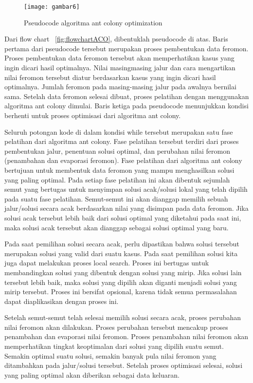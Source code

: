 \begin{itemize}
\begin{figure}[H]
	\centering
	\texttt{[image: gambar6]}
	\caption[Pseudocode ACO] {Pseudocode algoritma ant colony optimization}
	\label{fig:pseudocodeACO}
\end{figure}

Dari flow chart ~\ref{fig:flowchartACO}, dibentuklah pseudocode di atas. Baris pertama
dari pseudocode tersebut merupakan proses pembentukan data feromon. Proses pembentukan data
feromon tersebut akan memperhatikan kasus yang ingin dicari hasil optimalnya. Nilai masingmasing
jalur dan cara mengartikan nilai feromon tersebut diatur berdasarkan kasus yang ingin
dicari hasil optimalnya. Jumlah feromon pada masing-masing jalur pada awalnya bernilai sama.
Setelah data feromon selesai dibuat, proses pelatihan dengan menggunakan algoritma ant colony
dimulai. Baris ketiga pada pseudocode menunjukkan kondisi berhenti untuk proses optimisasi dari
algoritma ant colony. 

Seluruh potongan kode di dalam kondisi while tersebut merupakan satu fase
pelatihan dari algoritma ant colony. Fase pelatihan tersebut terdiri dari proses pembentukan jalur,
penentuan solusi optimal, dan perubahan nilai feromon (penambahan dan evaporasi feromon).
Fase pelatihan dari algoritma ant colony bertujuan untuk membentuk data feromon yang mampu
menghasilkan solusi yang paling optimal. Pada setiap fase pelatihan ini akan dibentuk sejumlah
semut yang bertugas untuk menyimpan solusi acak/solusi lokal yang telah dipilih pada suatu fase
pelatihan. Semut-semut ini akan dianggap memilih sebuah jalur/solusi secara acak berdasarkan
nilai yang disimpan pada data feromon. Jika solusi acak tersebut lebih baik dari solusi optimal
yang diketahui pada saat ini, maka solusi acak tersebut akan dianggap sebagai solusi optimal yang
baru.

Pada saat pemilihan solusi secara acak, perlu dipastikan bahwa solusi tersebut merupakan solusi
yang valid dari suatu kasus. Pada saat pemilihan solusi kita juga dapat melakukan proses local
search. Proses ini bertugas untuk membandingkan solusi yang dibentuk dengan solusi yang mirip.
Jika solusi lain tersebut lebih baik, maka solusi yang dipilih akan diganti menjadi solusi yang mirip
tersebut. Proses ini bersifat opsional, karena tidak semua permasalahan dapat diaplikasikan dengan
proses ini.

Setelah semut-semut telah selesai memilih solusi secara acak, proses perubahan nilai feromon
akan dilakukan. Proses perubahan tersebut mencakup proses penambahan dan evaporasi nilai
feromon. Proses penambahan nilai feromon akan memperhatikan tingkat keoptimalan dari solusi
yang dipilih suatu semut. Semakin optimal suatu solusi, semakin banyak pula nilai feromon yang
ditambahkan pada jalur/solusi tersebut. Setelah proses optimisasi selesai, solusi yang paling optimal
akan diberikan sebagai data keluaran.

\end{itemize}

